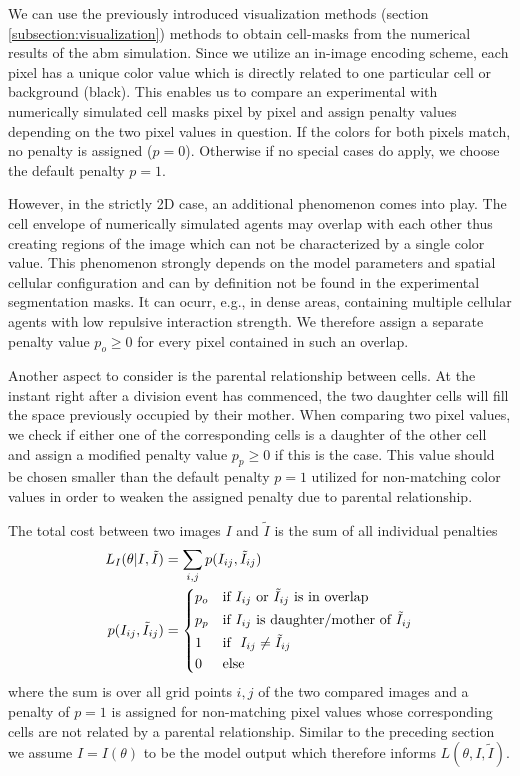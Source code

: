 \documentclass[10pt,letterpaper]{article}
\begin{document}
We can use the previously introduced visualization methods (section \ref{subsection:visualization})
methods to obtain cell-masks from the numerical results of the \ac{abm} simulation.
Since we utilize an in-image encoding scheme, each pixel has a unique color value which is directly
related to one particular cell or background (black).
This enables us to compare an experimental with numerically simulated cell masks pixel by pixel and
assign penalty values depending on the two pixel values in question.
If the colors for both pixels match, no penalty is assigned ($p=0$).
Otherwise if no special cases do apply, we choose the default penalty $p=1$.

However, in the strictly 2D case, an additional phenomenon comes into play.
The cell envelope of numerically simulated agents may overlap with each other thus creating regions
of the image which can not be characterized by a single color value.
This phenomenon strongly depends on the model parameters and spatial cellular configuration and can
by definition not be found in the experimental segmentation masks.
It can ocurr, e.g., in dense areas, containing multiple cellular agents with low repulsive
interaction strength.
We therefore assign a separate penalty value $p_o\geq0$ for every pixel contained in such an
overlap.

Another aspect to consider is the parental relationship between cells.
At the instant right after a division event has commenced, the two daughter cells will fill the
space previously occupied by their mother.
When comparing two pixel values, we check if either one of the corresponding cells is a daughter of
the other cell and assign a modified penalty value $p_p\geq0$ if this is the case.
This value should be chosen smaller than the default penalty $p=1$ utilized for non-matching color
values in order to weaken the assigned penalty due to parental relationship.

The total cost between two images $I$ and $\tilde{I}$ is the sum of all individual penalties
\begin{align}
    L_I(\theta|I,\tilde{I}) &= \sum\limits_{i,j} p(I_{ij}, \tilde{I}_{ij})\\
    p(I_{ij},\tilde{I}_{ij}) &= \begin{cases*}
        p_o & \text{if $I_{ij}$ or $\tilde{I}_{ij}$ is in overlap}\\
        p_p & \text{if $I_{ij}$ is daughter/mother of $\tilde{I}_{ij}$}\\
        1 & \text{if } $I_{ij}\neq \tilde{I}_{ij}$\\
        0 & \text{else}
    \end{cases*}
\end{align}
where the sum is over all grid points $i,j$ of the two compared images and a penalty of $p=1$ is
assigned for non-matching pixel values whose corresponding cells are not related by a parental
relationship.
Similar to the preceding section we assume $I=I(\theta)$ to be the model output which therefore
informs $L(\theta,I,\tilde{I})$.
\end{document}

